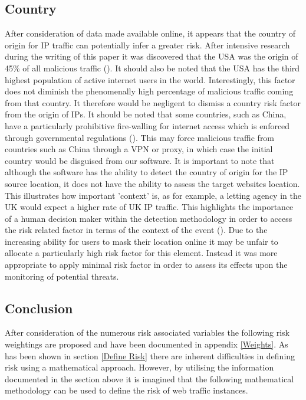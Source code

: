 \subsection{Country}

After consideration of data made available online, it appears that the country of origin for IP traffic can potentially infer a greater risk. After intensive research during the writing of this paper it was discovered that the USA was the origin of 45\% of all malicious traffic (\cite{Webattacks}). It should also be noted that the USA has the third highest population of active internet users in the world. Interestingly, this factor does not diminish the phenomenally high percentage of malicious traffic coming from that country. It therefore would be negligent to dismiss a country risk factor from the origin of IPs. It should be noted that some countries, such as China, have a particularly prohibitive fire-walling for internet access which is enforced through governmental regulations (\cite{China}). This may force malicious traffic from countries such as China through a VPN or proxy, in which case the initial country would be disguised from our software. It is important to note that although the software has the ability to detect the country of origin for the IP source location, it does not have the ability to assess the target websites location. This illustrates how important 'context' is, as for example, a letting agency in the UK would expect a higher rate of UK IP traffic. This highlights the importance of a human decision maker within the detection methodology in order to access the risk related factor in terms of the context of the event (\cite{cranor2008framework}). Due to the increasing ability for users to mask their location online it may be unfair to allocate a particularly high risk factor for this element. Instead it was more appropriate to apply minimal risk factor in order to assess its effects upon the monitoring of potential threats.

\subsection{Conclusion}

After consideration of the numerous risk associated variables the following risk weightings are proposed and have been documented in appendix \ref{Weights}. As has been shown in section \ref{Define Risk} there are inherent difficulties in defining risk using a mathematical approach. However, by utilising the information documented in the section above it is imagined that the following mathematical methodology can be used to define the risk of web traffic instances.

